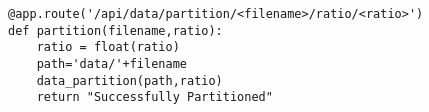 \begin{lstlisting}
@app.route('/api/data/partition/<filename>/ratio/<ratio>')
def partition(filename,ratio):
    ratio = float(ratio)
    path='data/'+filename
    data_partition(path,ratio)
    return "Successfully Partitioned"
\end{lstlisting}


\begin{comment}
\section{Draft: Deep Learning}

\section{Draft: Time Series}
\subsection{Overview of Time-Series Data}
This section will explore the make up of time-series (TS) data, and
the fundamental concepts needed to analyze TS date. More importantly
why simple linear regression models cannot be used. 
\subsection{Why is TS Data Important?}
This section will explore the application and relevance of TS data
with respect to big-data. 
\subsection{Forecasting TS data}
This section will explore TS forecasting methods such as the ARIMA
model, ARCH/GARCH model, Vector Autoregression model, LSTM model and
NARX Networks...time permitting ELMAN and JORDAN networks. 
 
\end{comment}
